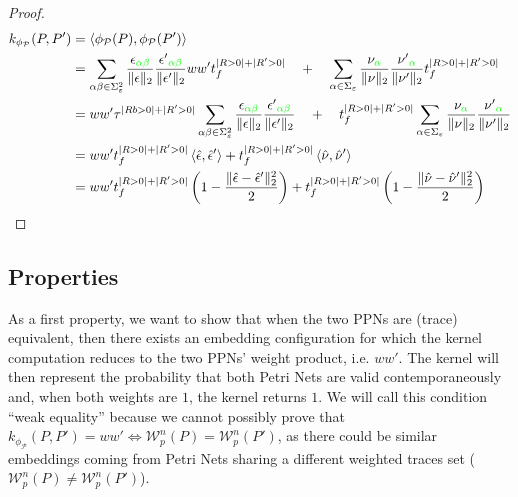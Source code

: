 \begin{proof}
$$\begin{aligned}
k_{\phi_{\mathcal{P}}}(P,P')&=\Braket{\phi_{\mathcal{P}}(P),\phi_{\mathcal{P}}(P')}\\
	&=\sum_{\alpha\beta\in \Sigma_\varepsilon^2}\frac{\epsilon_{\color{green}\alpha\beta}}{\|\epsilon\|_2}\frac{{\epsilon'}_{\color{green}\alpha\beta}}{\|\epsilon'\|_2}ww't_f^{|R>0|+|R'>0|}\quad+\quad \sum_{\alpha\in \Sigma_\varepsilon}\frac{\nu_{\color{green}\alpha}}{\|\nu\|_2}\frac{{\nu'}_{\color{green}\alpha}}{\|\nu'\|_2}t_f^{|R>0|+|R'>0|}\\
	&=ww'\tau^{|Rb>0|+|R'>0|}\sum_{\alpha\beta\in \Sigma_\varepsilon^2}\frac{\epsilon_{\color{green}\alpha\beta}}{\|\epsilon\|_2}\frac{{\epsilon'}_{\color{green}\alpha\beta}}{\|\epsilon'\|_2}\quad+\quad t_f^{|R>0|+|R'>0|}\sum_{\alpha\in \Sigma_\varepsilon}\frac{\nu_{\color{green}\alpha}}{\|\nu\|_2}\frac{{\nu'}_{\color{green}\alpha}}{\|\nu'\|_2}\\
	&=ww't_f^{|R>0|+|R'>0|}\Braket{\hat{\epsilon}, \hat{\epsilon}'}+ t_f^{|R>0|+|R'>0|}\Braket{\hat{\nu}, \hat{\nu}'}\\
	&=ww't_f^{|R>0|+|R'>0|}\left(1-\frac{\|\hat{\epsilon}- \hat{\epsilon}'\|_{2}^2}{2}\right)+ t_f^{|R>0|+|R'>0|}\left(1-\frac{\|\hat{\nu}- \hat{\nu}'\|_{2}^2}{2}\right)\\
\end{aligned}$$
\end{proof}

\subsection{Properties}
As a first property, we want to show that when the two PPNs are (trace) equivalent, then there exists an embedding configuration for which the kernel computation reduces to the two PPNs' weight product, i.e. $ww'$. The kernel will then represent the probability that both Petri Nets are valid contemporaneously and, when both weights are $1$, the kernel returns $1$. We will call this condition  ``weak equality'' because we cannot possibly prove that $k_{\phi_{\mathcal{P}}}(P,P')=ww'\Leftrightarrow \mathcal{W}_p^n(P)=\mathcal{W}_p^n(P')$, as there could be similar embeddings coming from Petri Nets sharing a different weighted traces set ($\mathcal{W}_p^n(P)\neq\mathcal{W}_p^n(P')$).

